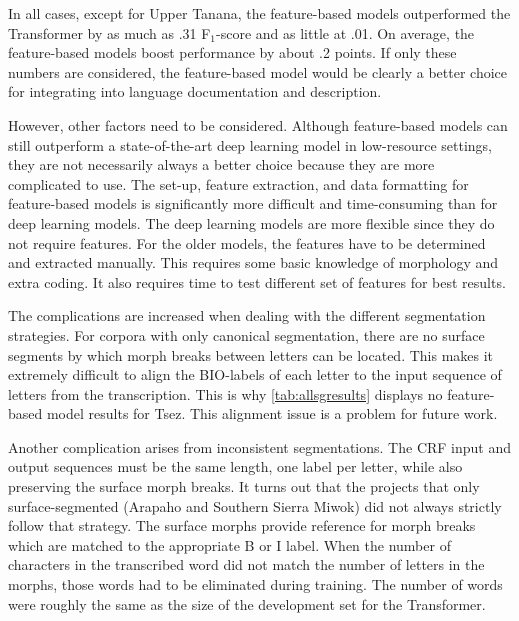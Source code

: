 In all cases, except for Upper Tanana, the feature-based models outperformed the Transformer by as much as .31 F$_1$-score and as little at .01. On average, the feature-based models boost performance by about .2 points. If only these numbers are considered, the feature-based model would be clearly a better choice for integrating into language documentation and description. 

However, other factors need to be considered. Although feature-based models can still outperform a state-of-the-art deep learning model in low-resource settings, they are not necessarily always a better choice because they are more complicated to use. The set-up, feature extraction, and data formatting for feature-based models is significantly more difficult and time-consuming than for deep learning models. The deep learning models are more flexible since they do not require features. For the older models, the features have to be determined and extracted manually. This requires some basic knowledge of morphology and extra coding. It also requires time to test different set of features for best results. 


The complications are increased when dealing with the different segmentation strategies. For corpora with only canonical segmentation, there are no surface segments by which morph breaks between letters can be located. This makes it extremely difficult to align the BIO-labels of each letter to the input sequence of letters from the transcription. This is why \autoref{tab:allsgresults} displays no feature-based model results for Tsez. This alignment issue is a problem for future work. 

Another complication arises from inconsistent segmentations. The CRF input and output sequences must be the same length, one label per letter, while also preserving the surface morph breaks. It turns out that the projects that only surface-segmented (Arapaho and Southern Sierra Miwok) did not always strictly follow that strategy. The surface morphs provide reference for morph breaks which are matched to the appropriate B or I label. When the number of characters in the transcribed word did not match the number of letters in the morphs, those words had to be eliminated during training. The number of words were roughly the same as the size of the development set for the Transformer.


